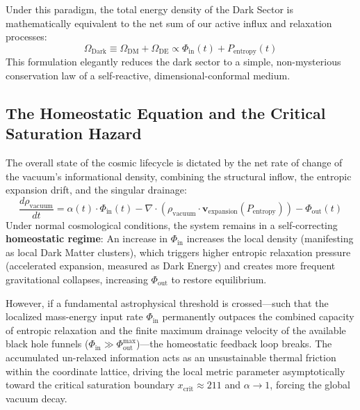 \documentclass[11pt,a4paper]{article}
\theoremstyle{plain}
\theoremstyle{definition}
\theoremstyle{remark}
\begin{document}
Under this paradigm, the total energy density of the Dark Sector is mathematically equivalent to the net sum of our active influx and relaxation processes:
\begin{equation}
\Omega_{\text{Dark}} \equiv \Omega_{\text{DM}} + \Omega_{\text{DE}} \propto \Phi_{\text{in}}(t) + P_{\text{entropy}}(t)
\end{equation}
This formulation elegantly reduces the dark sector to a simple, non-mysterious conservation law of a self-reactive, dimensional-conformal medium.

\subsection{The Homeostatic Equation and the Critical Saturation Hazard}
The overall state of the cosmic lifecycle is dictated by the net rate of change of the vacuum's informational density, combining the structural inflow, the entropic expansion drift, and the singular drainage:
\begin{equation}
\frac{d\rho_{\text{vacuum}}}{dt} = \alpha(t) \cdot \Phi_{\text{in}}(t) - \nabla \cdot \left( \rho_{\text{vacuum}} \cdot \mathbf{v}_{\text{expansion}}(P_{\text{entropy}}) \right) - \Phi_{\text{out}}(t)
\end{equation}
Under normal cosmological conditions, the system remains in a self-correcting \textbf{homeostatic regime}: An increase in $\Phi_{\text{in}}$ increases the local density (manifesting as local Dark Matter clusters), which triggers higher entropic relaxation pressure (accelerated expansion, measured as Dark Energy) and creates more frequent gravitational collapses, increasing $\Phi_{\text{out}}$ to restore equilibrium.

However, if a fundamental astrophysical threshold is crossed—such that the localized mass-energy input rate $\Phi_{\text{in}}$ permanently outpaces the combined capacity of entropic relaxation and the finite maximum drainage velocity of the available black hole funnels ($\Phi_{\text{in}} \gg \Phi_{\text{out}}^{\max}$)—the homeostatic feedback loop breaks. The accumulated un-relaxed information acts as an unsustainable thermal friction within the coordinate lattice, driving the local metric parameter asymptotically toward the critical saturation boundary $x_{\text{crit}} \approx 211$ and $\alpha \to 1$, forcing the global vacuum decay.
\end{document}
